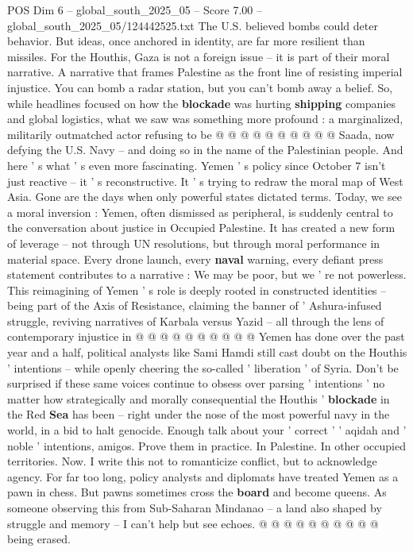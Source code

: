 \begin{textsample}{POS Dim 6 – global\_south\_2025\_05 – Score 7.00 – global\_south\_2025\_05/124442525.txt}
The U.S. believed bombs could deter behavior.
But ideas, once anchored in identity, are far more resilient than missiles.
For the Houthis, Gaza is not a foreign issue -- it is part of their moral narrative.
A narrative that frames Palestine as the front line of resisting imperial injustice.
You can bomb a radar station, but you can't bomb away a belief.
So, while headlines focused on how the \textbf{blockade} was hurting \textbf{shipping} companies and global logistics, what we saw was something more profound : a marginalized, militarily outmatched actor refusing to be @ @ @ @ @ @ @ @ @ @ Saada, now defying the U.S.
Navy -- and doing so in the name of the Palestinian people.
And here ' s what ' s even more fascinating.
Yemen ' s policy since October 7 isn't just reactive -- it ' s reconstructive.
It ' s trying to redraw the moral map of West Asia.
Gone are the days when only powerful states dictated terms.
Today, we see a moral inversion : Yemen, often dismissed as peripheral, is suddenly central to the conversation about justice in Occupied Palestine.
It has created a new form of leverage -- not through UN resolutions, but through moral performance in material space.
Every drone launch, every \textbf{naval} warning, every defiant press statement contributes to a narrative : We may be poor, but we ' re not powerless.
This reimagining of Yemen ' s role is deeply rooted in constructed identities -- being part of the Axis of Resistance, claiming the banner of ' Ashura-infused struggle, reviving narratives of Karbala versus Yazid -- all through the lens of contemporary injustice in @ @ @ @ @ @ @ @ @ @ Yemen has done over the past year and a half, political analysts like Sami Hamdi still cast doubt on the Houthis ' intentions -- while openly cheering the so-called ' liberation ' of Syria.
Don't be surprised if these same voices continue to obsess over parsing ' intentions ' no matter how strategically and morally consequential the Houthis ' \textbf{blockade} in the Red \textbf{Sea} has been -- right under the nose of the most powerful navy in the world, in a bid to halt genocide.
Enough talk about your ' correct ' ' aqidah and ' noble ' intentions, amigos.
Prove them in practice.
In Palestine.
In other occupied territories.
Now.
I write this not to romanticize conflict, but to acknowledge agency.
For far too long, policy analysts and diplomats have treated Yemen as a pawn in chess.
But pawns sometimes cross the \textbf{board} and become queens.
As someone observing this from Sub-Saharan Mindanao -- a land also shaped by struggle and memory -- I can't help but see echoes. @ @ @ @ @ @ @ @ @ @ being erased.

\end{textsample}
